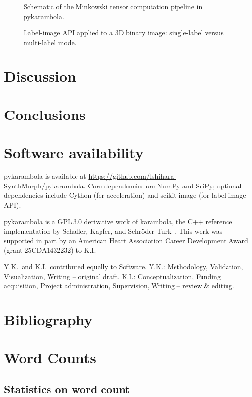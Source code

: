 \documentclass[times, twoside, watermark]{zHenriquesLab-StyleBioRxiv}
\begin{document}
\begin{figure}
\centering
\caption{Schematic of the Minkowski tensor computation pipeline in pykarambola.}
\label{fig:pipeline}
\end{figure}

\begin{figure}
\centering
\caption{Label-image API applied to a 3D binary image: single-label versus multi-label mode.}
\label{fig:labelimage}
\end{figure}


\section*{Discussion}


\section*{Conclusions}


\section*{Software availability}
pykarambola is available at \url{https://github.com/Ishihara-SynthMorph/pykarambola}.
Core dependencies are NumPy and SciPy; optional dependencies include Cython (for acceleration) and scikit-image (for label-image API).


\begin{acknowledgements}
pykarambola is a GPL\,3.0 derivative work of karambola, the C++ reference implementation by Schaller, Kapfer, and Schröder-Turk~\cite{Schaller2020karambola}.
This work was supported in part by an American Heart Association Career Development Award (grant 25CDA1432232) to K.I.
\end{acknowledgements}

\begin{contributions}
Y.K.\ and K.I.\ contributed equally to Software.
Y.K.: Methodology, Validation, Visualization, Writing -- original draft.
K.I.: Conceptualization, Funding acquisition, Project administration, Supervision, Writing -- review \& editing.
\end{contributions}

\section*{Bibliography}


\onecolumn
\newpage

\section*{Word Counts}
\subsection*{Statistics on word count}
\detailtexcount

\end{document}
